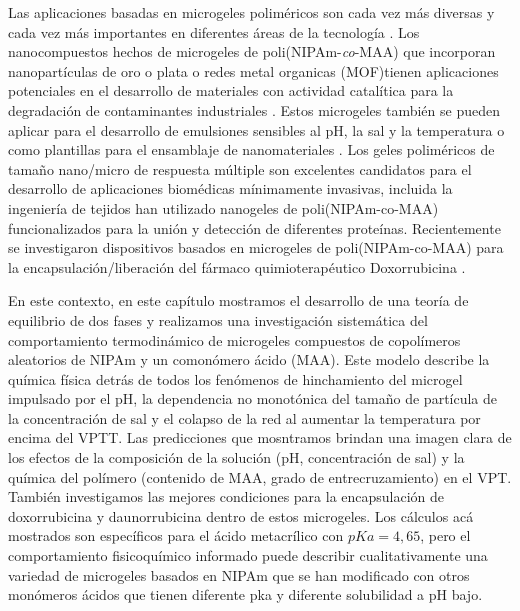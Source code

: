 Las aplicaciones basadas en microgeles polim\'ericos son cada vez m\'as diversas y cada vez m\'as importantes en diferentes \'areas de la tecnolog\'ia \cite{plamper2017functional}.
Los nanocompuestos hechos de microgeles de poli(NIPAm-\emph{co}-MAA) que incorporan nanopart\'iculas de oro o plata o redes metal organicas (MOF)tienen aplicaciones potenciales en el desarrollo de materiales con actividad catal\'itica  para la degradación de contaminantes industriales  \cite{Khan2013synthesis,Shi2014,Allegretto2020}.
Estos microgeles tambi\'en se pueden aplicar para el desarrollo de emulsiones sensibles al pH, la sal y la temperatura \cite{Ngai2005,Ngai2006, Brugger2008, Schmidt2011} o como plantillas para el ensamblaje de nanomateriales \cite{Wong2009}.
Los geles polim\'ericos de tama\~no nano/micro de respuesta m\'ultiple son excelentes candidatos para el desarrollo de aplicaciones biom\'edicas m\'inimamente invasivas, incluida la ingeniería de tejidos  \cite{Daly2020}
 \citet{Culver2017A}han utilizado nanogeles de poli(NIPAm-co-MAA) funcionalizados para la uni\'on y detecci\'on de diferentes prote\'inas.
Recientemente se investigaron dispositivos basados en microgeles de poli(NIPAm-co-MAA) para la encapsulación/liberaci\'on del f\'armaco quimioterap\'eutico Doxorrubicina \cite{Giussi2020, MartinezMoro2020, Pergushov2020}.

En este contexto, en este cap\'itulo mostramos el desarrollo de una teor\'ia de equilibrio de dos fases y realizamos una investigaci\'on sistem\'atica del comportamiento termodin\'amico de microgeles compuestos de copol\'imeros aleatorios de NIPAm y un comon\'omero \'acido (MAA).
Este modelo describe la qu\'imica f\'isica detr\'as de todos los fen\'omenos de hinchamiento del microgel impulsado por el pH, la dependencia no monot\'onica del tama\~no de part\'icula de la concentraci\'on de sal y el colapso de la red al aumentar la temperatura por encima del VPTT.
Las predicciones que mosntramos brindan una imagen clara de los efectos de la composici\'on de la soluci\'on (pH, concentración de sal) y la qu\'imica del pol\'imero (contenido de MAA, grado de entrecruzamiento) en el VPT.
Tambi\'en investigamos las mejores condiciones para la encapsulaci\'on de doxorrubicina y daunorrubicina dentro de estos microgeles.
Los c\'alculos  ac\'a mostrados son espec\'ificos para el \'acido metacr\'ilico con $pKa = 4,65$, pero el comportamiento fisicoqu\'imico informado puede describir cualitativamente una variedad de microgeles basados en NIPAm que se han modificado con otros mon\'omeros \'acidos que tienen diferente pka y diferente solubilidad a pH bajo.


